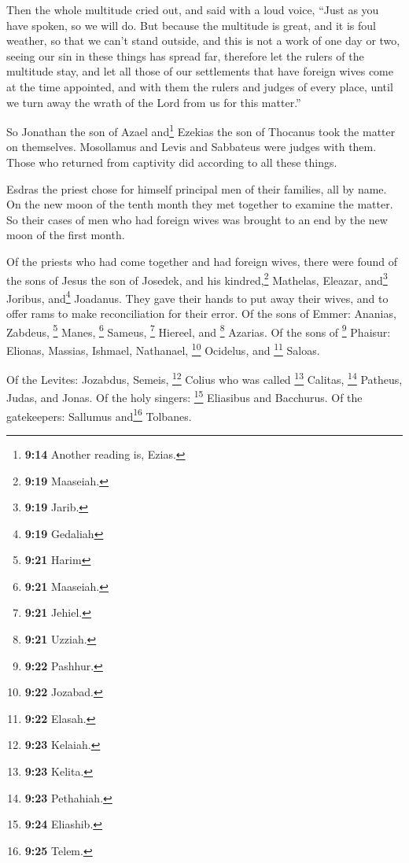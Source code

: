  Then the whole multitude cried out, and said with a loud
voice, ``Just as you have spoken, so we will do.  But
because the multitude is great, and it is foul weather, so that we can't
stand outside, and this is not a work of one day or two, seeing our sin
in these things has spread far,  therefore let the rulers
of the multitude stay, and let all those of our settlements that have
foreign wives come at the time appointed,  and with them
the rulers and judges of every place, until we turn away the wrath of
the Lord from us for this matter.''

 So Jonathan the son of Azael and\footnote{\textbf{9:14}
  Another reading is, Ezias.} Ezekias the son of Thocanus took the
matter on themselves. Mosollamus and Levis and Sabbateus were judges
with them.  Those who returned from captivity did
according to all these things.

 Esdras the priest chose for himself principal men of
their families, all by name. On the new moon of the tenth month they met
together to examine the matter.  So their cases of men
who had foreign wives was brought to an end by the new moon of the first
month.

 Of the priests who had come together and had foreign
wives, there were found  of the sons of Jesus the son of
Josedek, and his kindred,\footnote{\textbf{9:19} Maaseiah.} Mathelas,
Eleazar, and\footnote{\textbf{9:19} Jarib.} Joribus, and\footnote{\textbf{9:19}
  Gedaliah} Joadanus.  They gave their hands to put away
their wives, and to offer rams to make reconciliation for their error.
 Of the sons of Emmer: Ananias, Zabdeus, \footnote{\textbf{9:21}
  Harim} Manes, \footnote{\textbf{9:21} Maaseiah.} Sameus, \footnote{\textbf{9:21}
  Jehiel.} Hiereel, and \footnote{\textbf{9:21} Uzziah.} Azarias.
 Of the sons of \footnote{\textbf{9:22} Pashhur.}
Phaisur: Elionas, Massias, Ishmael, Nathanael, \footnote{\textbf{9:22}
  Jozabad.} Ocidelus, and \footnote{\textbf{9:22} Elasah.} Saloas.

 Of the Levites: Jozabdus, Semeis, \footnote{\textbf{9:23}
  Kelaiah.} Colius who was called \footnote{\textbf{9:23} Kelita.}
Calitas, \footnote{\textbf{9:23} Pethahiah.} Patheus, Judas, and Jonas.
 Of the holy singers: \footnote{\textbf{9:24} Eliashib.}
Eliasibus and Bacchurus.  Of the gatekeepers: Sallumus
and\footnote{\textbf{9:25} Telem.} Tolbanes.

